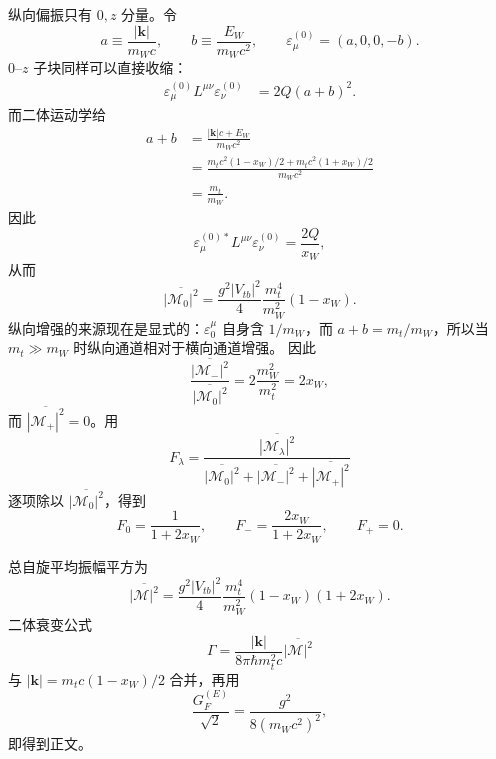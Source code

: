 \begin{derivation}[顶夸克衰变中的矢量螺旋度比例]
纵向偏振只有 $0,z$ 分量。令
\begin{equation*}
 a\equiv\frac{|\mathbf k|}{m_Wc},
 \qquad
 b\equiv\frac{E_W}{m_Wc^2},
 \qquad
 \varepsilon_{\mu}^{(0)}=(a,0,0,-b).
\end{equation*}
$0$--$z$ 子块同样可以直接收缩：
\begin{align*}
\varepsilon_{\mu}^{(0)}L^{\mu\nu}\varepsilon_{\nu}^{(0)}
&=2Q(a+b)^2.
\end{align*}
而二体运动学给
\begin{align*}
 a+b
&=\frac{|\mathbf k|c+E_W}{m_Wc^2}\\
&=\frac{m_tc^2(1-x_W)/2+m_tc^2(1+x_W)/2}{m_Wc^2}\\
&=\frac{m_t}{m_W}.
\end{align*}
因此
\begin{equation*}
\varepsilon_{\mu}^{(0)*}L^{\mu\nu}\varepsilon_{\nu}^{(0)}
=\frac{2Q}{x_W},
\end{equation*}
从而
\begin{equation*}
 \boxed{
 \overline{|\mathcal M_0|^2}
 =\frac{g^2|V_{tb}|^2}{4}
 \frac{m_t^4}{m_W^2}(1-x_W)}.
\end{equation*}
纵向增强的来源现在是显式的：$\varepsilon_0^\mu$ 自身含 $1/m_W$，而 $a+b=m_t/m_W$，所以当 $m_t\gg m_W$ 时纵向通道相对于横向通道增强。
因此
\begin{equation*}
 \frac{\overline{|\mathcal M_-|^2}}
 {\overline{|\mathcal M_0|^2}}
 =2\frac{m_W^2}{m_t^2}=2x_W,
\end{equation*}
而 $\overline{|\mathcal M_+|^2}=0$。用
\begin{equation*}
F_\lambda
=\frac{\overline{|\mathcal M_\lambda|^2}}
{\overline{|\mathcal M_0|^2}+\overline{|\mathcal M_-|^2}+\overline{|\mathcal M_+|^2}}
\end{equation*}
逐项除以 $\overline{|\mathcal M_0|^2}$，得到
\begin{equation*}
 F_0=\frac1{1+2x_W},
 \qquad
 F_-=\frac{2x_W}{1+2x_W},
 \qquad
 F_+=0.
\end{equation*}

总自旋平均振幅平方为
\begin{equation*}
 \overline{|\mathcal M|^2}
 =\frac{g^2|V_{tb}|^2}{4}
 \frac{m_t^4}{m_W^2}(1-x_W)(1+2x_W).
\end{equation*}
二体衰变公式
\begin{equation*}
 \Gamma
 =\frac{|\mathbf k|}{8\pi\hbar m_t^2c}
 \overline{|\mathcal M|^2}
\end{equation*}
与 $|\mathbf k|=m_tc(1-x_W)/2$ 合并，再用
\begin{equation*}
 \frac{G_F^{(E)}}{\sqrt2}=\frac{g^2}{8(m_Wc^2)^2},
\end{equation*}
即得到正文。
\end{derivation}

